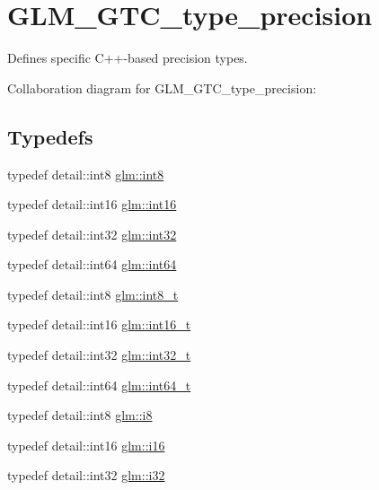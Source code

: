 \hypertarget{group__gtc__type__precision}{}\section{G\+L\+M\+\_\+\+G\+T\+C\+\_\+type\+\_\+precision}
\label{group__gtc__type__precision}


Defines specific C++-\/based precision types.  


Collaboration diagram for G\+L\+M\+\_\+\+G\+T\+C\+\_\+type\+\_\+precision\+:
\subsection*{Typedefs}
\begin{DoxyCompactItemize}
\item 
typedef detail\+::int8 \hyperlink{group__gtc__type__precision_ga96254f9c1c4506fc8eb5cf3301ce8565}{glm\+::int8}
\item 
typedef detail\+::int16 \hyperlink{group__gtc__type__precision_ga2945a61d12771f8954994fcddf02b021}{glm\+::int16}
\item 
typedef detail\+::int32 \hyperlink{group__gtc__type__precision_ga632d8b25f6b61659f39ea4321fab92a4}{glm\+::int32}
\item 
typedef detail\+::int64 \hyperlink{group__gtc__type__precision_ga435d75819cce297cc5fa21bd84ef89a5}{glm\+::int64}
\item 
typedef detail\+::int8 \hyperlink{group__gtc__type__precision_ga673898d450b2a91186f3c4f40c5f8633}{glm\+::int8\+\_\+t}
\item 
typedef detail\+::int16 \hyperlink{group__gtc__type__precision_gaf89ee61e0d34aa4a462104b7ae7f2da6}{glm\+::int16\+\_\+t}
\item 
typedef detail\+::int32 \hyperlink{group__gtc__type__precision_gab870c0eb6f525b0c8c4716762e0fc3a8}{glm\+::int32\+\_\+t}
\item 
typedef detail\+::int64 \hyperlink{group__gtc__type__precision_ga6abb23fbf4e39c50ec5341160b5da5ab}{glm\+::int64\+\_\+t}
\item 
typedef detail\+::int8 \hyperlink{group__gtc__type__precision_gaae064be68b7d36cd7910c16e8ad18bba}{glm\+::i8}
\item 
typedef detail\+::int16 \hyperlink{group__gtc__type__precision_ga35e5542ca05b29cc256fdafb8503d1fd}{glm\+::i16}
\item 
typedef detail\+::int32 \hyperlink{group__gtc__type__precision_ga1d8ed5c43e91ea7d4528389da4fa9524}{glm\+::i32}

\end{DoxyCompactItemize}
